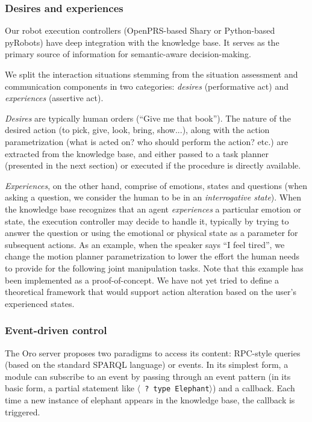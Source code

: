 \documentclass[preprint,12pt]{elsarticle}
\newcommand{\stmt}[1]{{\footnotesize \tt $\langle$ #1\relax$\rangle$}}
\begin{document}
\subsubsection{Desires and experiences}

Our robot execution controllers (OpenPRS-based {\sc Shary} or Python-based {\sc
pyRobots}) have deep integration with the knowledge base. It serves as the
primary source of information for semantic-aware decision-making.

We split the interaction situations stemming from the situation assessment and
communication components in two categories: \emph{desires} (performative act)
and \emph{experiences} (assertive act).

\emph{Desires} are typically human orders (``Give me that book''). The nature
of the desired action (to pick, give, look, bring, show...), along with the
action parametrization (what is acted on? who should perform the action? etc.)
are extracted from the knowledge base, and either passed to a task planner
(presented in the next section) or executed if the procedure is directly
available.

\emph{Experiences}, on the other hand, comprise of emotions, states and
questions (when asking a question, we consider the human to be in an
\emph{interrogative state}). When the knowledge base recognizes that an agent
\emph{experiences} a particular emotion or state, the execution controller may
decide to handle it, typically by trying to answer the question or using the
emotional or physical state as a parameter for subsequent actions. As an example,
when the speaker says ``I feel tired'', we change the motion planner
parametrization to lower the effort the human needs to provide for the following
joint manipulation tasks. Note that this example has been implemented as a
proof-of-concept. We have not yet tried to define a theoretical framework that
would support action alteration based on the user's experienced states.

\subsubsection{Event-driven control}

The {\sc Oro} server proposes two paradigms to access its content: RPC-style
queries (based on the standard SPARQL language) or events. In its simplest
form, a module can subscribe to an event by passing through an event pattern
(in its basic form, a partial statement like \stmt{? type Elephant}) and a
callback.  Each time a new instance of elephant appears in the knowledge base,
the callback is triggered.
\end{document}
